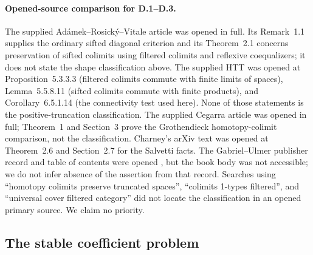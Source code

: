 \documentclass[11pt,a4paper]{article}
\theoremstyle{definition}
\begin{document}
\paragraph{Opened-source comparison for D.1--D.3.}
The supplied Ad\'amek--Rosick\'y--Vitale article was opened in full.
Its Remark~1.1 supplies the ordinary sifted diagonal criterion and
its Theorem~2.1 concerns preservation of sifted colimits using
filtered colimits and reflexive coequalizers; it does not state the
shape classification above. The supplied HTT was opened at
Proposition~5.3.3.3 (filtered colimits commute with finite limits
of spaces), Lemma~5.5.8.11 (sifted colimits commute with finite
products), and Corollary~6.5.1.14 (the connectivity test used here).
None of those statements is the positive-truncation classification.
The supplied Cegarra article was opened in full; Theorem~1 and
Section~3 prove the Grothendieck homotopy-colimit comparison,
not the classification. Charney's arXiv text was opened at
Theorem~2.6 and Section~2.7 for the Salvetti facts. The
Gabriel--Ulmer publisher record and table of contents were opened \citep{GabrielUlmer1971},
but the book body was not accessible; we do not infer absence of
the assertion from that record. Searches using ``homotopy colimits
preserve truncated spaces'', ``colimits 1-types filtered'', and
``universal cover filtered category'' did not locate the
classification in an opened primary source. We claim no priority.


\subsection{The stable coefficient problem}
\end{document}
